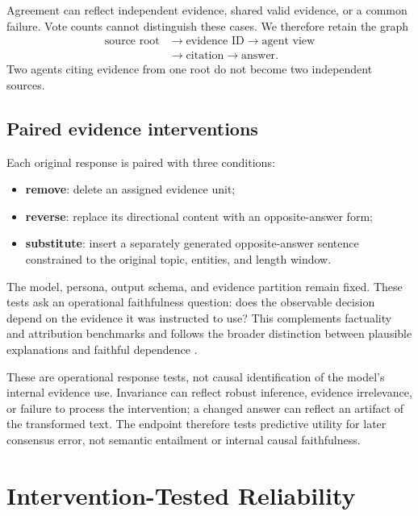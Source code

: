\documentclass[11pt]{article}
\begin{document}
Agreement can reflect independent evidence, shared valid evidence, or a common failure. Vote counts cannot distinguish these cases. We therefore retain the graph
\begin{equation}
\begin{aligned}
\text{source root}&\rightarrow\text{evidence ID}\rightarrow\text{agent view}\\
&\rightarrow\text{citation}\rightarrow\text{answer}.
\end{aligned}
\end{equation}
Two agents citing evidence from one root do not become two independent sources.

\subsection{Paired evidence interventions}

Each original response is paired with three conditions:
\begin{itemize}
    \item \textbf{remove}: delete an assigned evidence unit;
    \item \textbf{reverse}: replace its directional content with an opposite-answer form;
    \item \textbf{substitute}: insert a separately generated opposite-answer sentence constrained to the original topic, entities, and length window.
\end{itemize}
The model, persona, output schema, and evidence partition remain fixed. These tests ask an operational faithfulness question: does the observable decision depend on the evidence it was instructed to use? This complements factuality and attribution benchmarks \citep{thorne2018fever,lin2022truthfulqa,muller2023attribution} and follows the broader distinction between plausible explanations and faithful dependence \citep{jacovi2020faithfully,wiegreffe2019attention}.

These are operational response tests, not causal identification of the model's internal evidence use. Invariance can reflect robust inference, evidence irrelevance, or failure to process the intervention; a changed answer can reflect an artifact of the transformed text. The endpoint therefore tests predictive utility for later consensus error, not semantic entailment or internal causal faithfulness.

\section{Intervention-Tested Reliability}
\end{document}
